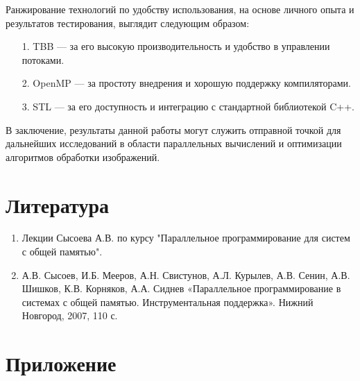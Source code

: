 \documentclass{report}
\begin{document}
\par Ранжирование технологий по удобству использования, на основе личного опыта и результатов тестирования, выглядит следующим образом:
\begin{itemize}
    \item[1.] TBB — за его высокую производительность и удобство в управлении потоками.
    \item[2.] OpenMP — за простоту внедрения и хорошую поддержку компиляторами.
    \item[3.] STL — за его доступность и интеграцию с стандартной библиотекой C++.
\end{itemize}

\par В заключение, результаты данной работы могут служить отправной точкой для дальнейших исследований в области параллельных вычислений и оптимизации алгоритмов обработки изображений.

\newpage


\section*{Литература}
\begin{enumerate}
    \item Лекции Сысоева А.В. по курсу "Параллельное программирование для систем с общей памятью".
    \item А.В. Сысоев, И.Б. Мееров, А.Н. Свистунов, А.Л. Курылев, А.В. Сенин, А.В. Шишков, К.В. Корняков, А.А. Сиднев «Параллельное программирование в системах с общей памятью. Инструментальная поддержка». Нижний Новгород, 2007, 110 с.
\end{enumerate}

\newpage

\section*{Приложение}
\end{document}
